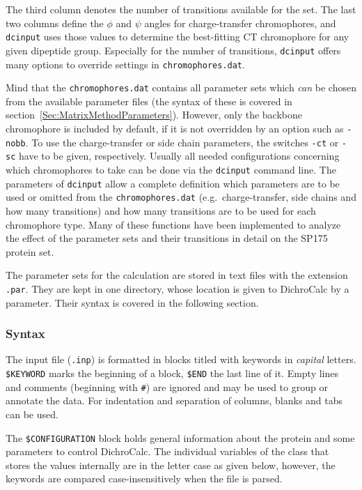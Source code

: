 \documentclass[11pt, letterpaper]{article}
\begin{document}
The third column denotes the number of transitions available for the set. The last two columns define the $\phi$ and $\psi$ angles for charge-transfer chromophores, and \verb'dcinput' uses those values to determine the best-fitting CT chromophore for any given dipeptide group. Especially for the number of transitions, \verb'dcinput' offers many options to override settings in \verb'chromophores.dat'.

Mind that the \verb'chromophores.dat' contains all parameter sets which \emph{can} be chosen from the available parameter files (the syntax of these is covered in section~\ref{Sec:MatrixMethodParameters}). However, only the backbone chromophore is included by default, if it is not overridden by an option such as \verb'-nobb'. To use the charge-transfer or side chain parameters, the switches \verb'-ct' or \verb'-sc' have to be given, respectively. Usually all needed configurations concerning which chromophores to take can be done via the \verb'dcinput' command line. The parameters of \verb'dcinput' allow a complete definition which parameters are to be used or omitted from the \verb'chromophores.dat' (e.g.\ charge-transfer, side chains and how many transitions) and how many transitions are to be used for each chromophore type. Many of these functions have been implemented to analyze the effect of the parameter sets and their transitions in detail on the SP175 protein set.\cite{Bulheller:08:1866}

The parameter sets for the calculation are stored in text files with the extension \verb'.par'. They are kept in one directory, whose location is given to DichroCalc by a parameter. Their syntax is covered in the following section.




\subsubsection{Syntax}

The input file (\verb'.inp') is formatted in blocks titled with keywords in \emph{capital} letters. \verb'$KEYWORD' marks the beginning of a block, \verb'$END' the last line of it. Empty lines and comments (beginning with \verb'#') are ignored and may be used to group or annotate the data. For indentation and separation of columns, blanks and tabs can be used. 

The \verb'$CONFIGURATION' block holds general information about the protein and some parameters to control DichroCalc. The individual variables of the class that stores the values internally are in the letter case as given below, however, the keywords are compared case-insensitively when the file is parsed.
\end{document}
